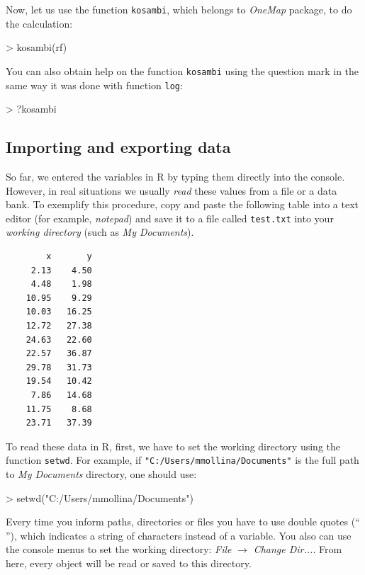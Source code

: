 \documentclass[letterpaper,12pt,oneside]{article}
\begin{document}
Now, let us use the function {\tt kosambi}, which belongs to {\it OneMap} package, to do the calculation:

\begin{Schunk}
\begin{Sinput}
> kosambi(rf)
\end{Sinput}
\end{Schunk}

You can also obtain help on the function {\tt kosambi} using the question mark in the same way it was done with function {\tt log}:

\begin{Schunk}
\begin{Sinput}
> ?kosambi
\end{Sinput}
\end{Schunk}

\subsection{Importing and exporting data}
\label{import} 
So far, we entered the variables in R by typing them directly into the console. However, in real situations we usually {\it read} these values from a file or a data bank. To exemplify this procedure, copy and paste the following table into a text editor (for example, {\it notepad}) and save it to a file called {\tt test.txt} into your {\it working directory} (such as {\it My Documents}).

\begin{footnotesize}
\begin{verbatim}
        x       y
     2.13    4.50
     4.48    1.98
    10.95    9.29
    10.03   16.25
    12.72   27.38
    24.63   22.60
    22.57   36.87
    29.78   31.73
    19.54   10.42
     7.86   14.68
    11.75    8.68
    23.71   37.39
\end{verbatim}
\end{footnotesize}

To read these data in R, first, we have to set the working directory using the function {\tt setwd}.  For example, if {\tt"C:/Users/mmollina/Documents"} is the full path to {\it My Documents} directory, one should use:

\begin{Schunk}
\begin{Sinput}
> setwd("C:/Users/mmollina/Documents")
\end{Sinput}
\end{Schunk}

Every time you inform paths, directories or files you have to use double quotes (`` ''), which indicates a string of characters instead of a variable. You also can use the console menus to set the working directory: {\it File} $ \rightarrow $ {\it Change Dir...}. From here, every object will be read or saved to this directory.
\end{document}
